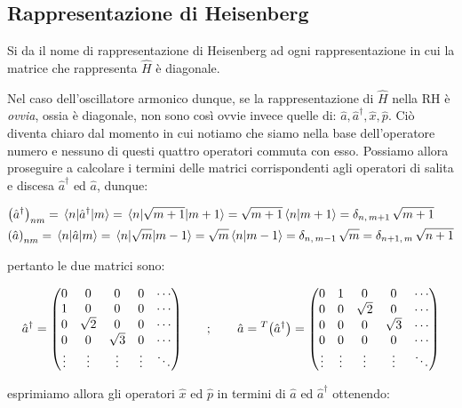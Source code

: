 \subsection{Rappresentazione di Heisenberg}

\begin{nb}
	Si da il nome di rappresentazione di Heisenberg ad ogni rappresentazione in cui la matrice che rappresenta $\hat{H}$ è diagonale.
\end{nb}

	Nel caso dell'oscillatore armonico dunque, se la rappresentazione di $\hat{H}$ nella RH è \textit{ovvia}, ossia è diagonale, non sono così ovvie invece quelle di: $\hat{a}, \hat{a}^{\dagger}, \hat{x}, \hat{p}$. Ciò diventa chiaro dal momento in cui notiamo che siamo nella base dell'operatore numero e nessuno di questi quattro operatori commuta con esso. Possiamo allora proseguire a calcolare i termini delle matrici corrispondenti agli operatori di salita e discesa $\hat{a}^{\dagger}$ ed $\hat{a}$, dunque:
	
\begin{align*}
	&\qty(\hat{a}^{\dagger})_{nm} = \mel{n}{\hat{a}^{\dagger}}{m} = \mel{n}{\sqrt{m+1}}{m+1} = \sqrt{m+1} \braket{n}{m+1} = \delta_{n, \, m+1} \, \sqrt{m+1} \\
	& \qty(\hat{a})_{nm} = \mel{n}{\hat{a}}{m} = \mel{n}{\sqrt{m}}{m-1} = \sqrt{m} \braket{n}{m-1} = \delta_{n, \, m-1} \, \sqrt{m} = \delta_{n+1, \, m} \, \sqrt{n+1}
\end{align*}

	pertanto le due matrici sono:
	
\begin{align*}
	\hat{a}^{\dagger} = \mqty(0&0&0&0& \cdots \\ 1&0&0&0& \cdots \\ 0&\sqrt{2}&0&0& \cdots \\ 0&0&\sqrt{3}&0& \cdots \\ \vdots&\vdots&\vdots&\vdots& \ddots ) \qquad ; \qquad \hat{a} = {}^T \qty(\hat{a}^{\dagger})=  \mqty(0&1&0&0& \cdots \\0&0&\sqrt{2}&0& \cdots \\ 0&0&0&\sqrt{3}& \cdots \\ 0&0&0&0& \cdots \\\vdots&\vdots&\vdots&\vdots& \ddots )
\end{align*}

	esprimiamo allora gli operatori $\hat{x}$ ed $\hat{p}$ in termini di $\hat{a}$ ed $\hat{a}^{\dagger}$ ottenendo:

